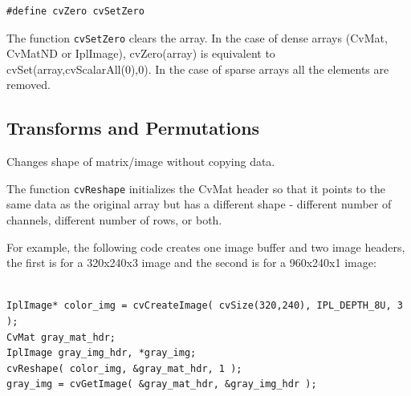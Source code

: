 \begin{lstlisting}
#define cvZero cvSetZero
\end{lstlisting}

\begin{description}
\end{description}

The function \texttt{cvSetZero} clears the array. In the case of dense arrays (CvMat, CvMatND or IplImage), cvZero(array) is equivalent to
cvSet(array,cvScalarAll(0),0).
In the case of sparse arrays all the elements are removed.

\subsection{Transforms and Permutations}

\label{Reshape}

Changes shape of matrix/image without copying data.


\begin{description}
\ifC
{}
\fi
{}
\end{description}

The function \texttt{cvReshape} initializes the CvMat header so that it points to the same data as the original array but has a different shape - different number of channels, different number of rows, or both.

\ifC
For example, the following code creates one image buffer and two image headers, the first is for a 320x240x3 image and the second is for a 960x240x1 image:

\begin{lstlisting}

IplImage* color_img = cvCreateImage( cvSize(320,240), IPL_DEPTH_8U, 3 );
CvMat gray_mat_hdr;
IplImage gray_img_hdr, *gray_img;
cvReshape( color_img, &gray_mat_hdr, 1 );
gray_img = cvGetImage( &gray_mat_hdr, &gray_img_hdr );

\end{lstlisting}

